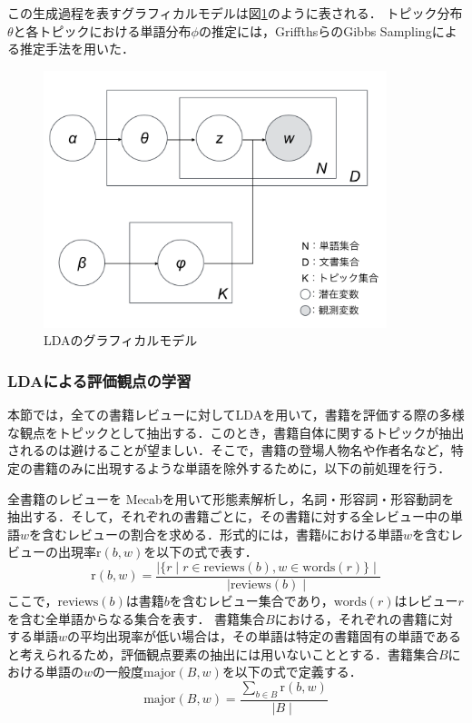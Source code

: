 \documentclass[a4paper,11pt,oneside,openany]{jsbook}
\begin{document}
この生成過程を表すグラフィカルモデルは図\ref{fig:lda}のように表される．
トピック分布$\theta$と各トピックにおける単語分布$\phi$の推定には，GriffthsらのGibbs Samplingによる推定手法を用いた\cite{gibbs}．
\begin{figure}[htb]
	\begin{center} %
		\includegraphics[width = 100mm]{figures/LDA.pdf} %
	\end{center}
	\caption{LDAのグラフィカルモデル} %
	\label{fig:lda} %
\end{figure}

\subsubsection{LDAによる評価観点の学習}
		\label{subsubsec:learning}
本節では，全ての書籍レビューに対してLDAを用いて，書籍を評価する際の多様な観点をトピックとして抽出する．このとき，書籍自体に関するトピックが抽出されるのは避けることが望ましい．そこで，書籍の登場人物名や作者名など，特定の書籍のみに出現するような単語を除外するために，以下の前処理を行う．
\par
全書籍のレビューを Mecab\cite{mecab}を用いて形態素解析し，名詞・形容詞・形容動詞を抽出する．そして，それぞれの書籍ごとに，その書籍に対する全レビュー中の単語$w$を含むレビューの割合を求める．形式的には，書籍$b$における単語$w$を含むレビューの出現率$\mathrm{r}(b,w)$を以下の式で表す．
\begin{equation}
\mathrm{r}(b,w) = \frac{ \mid\{r \mid r \in \mathrm{reviews}(b), w \in \mathrm{words}(r)\}\mid}{\mid \mathrm{reviews}(b) \mid }
\end{equation}
ここで，$\mathrm{reviews}(b)$は書籍$b$を含むレビュー集合であり，$\mathrm{words}(r)$はレビュー$r$を含む全単語からなる集合を表す．
書籍集合$B$における，それぞれの書籍に対する単語$w$の平均出現率が低い場合は，その単語は特定の書籍固有の単語であると考えられるため，評価観点要素の抽出には用いないこととする．書籍集合$B$における単語の$w$の一般度$\mathrm{major}(B,w)$を以下の式で定義する．
\begin{equation}
\mathrm{major}(B,w) = \frac{\sum_{b\in B}{\mathrm{r}(b,w)}}{\mid B \mid}
\end{equation}
\end{document}
